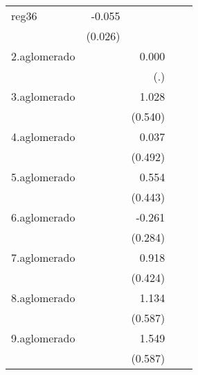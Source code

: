 {\begin{longtable}{l*{4}{D{.}{.}{-1}}}
\addlinespace
reg36       &      -0.055\sym{*}  &                     &                     &                     \\
            &     (0.026)         &                     &                     &                     \\
\addlinespace
2.aglomerado&                     &       0.000         &                     &                     \\
            &                     &         (.)         &                     &                     \\
\addlinespace
3.aglomerado&                     &       1.028         &                     &                     \\
            &                     &     (0.540)         &                     &                     \\
\addlinespace
4.aglomerado&                     &       0.037         &                     &                     \\
            &                     &     (0.492)         &                     &                     \\
\addlinespace
5.aglomerado&                     &       0.554         &                     &                     \\
            &                     &     (0.443)         &                     &                     \\
\addlinespace
6.aglomerado&                     &      -0.261         &                     &                     \\
            &                     &     (0.284)         &                     &                     \\
\addlinespace
7.aglomerado&                     &       0.918\sym{*}  &                     &                     \\
            &                     &     (0.424)         &                     &                     \\
\addlinespace
8.aglomerado&                     &       1.134         &                     &                     \\
            &                     &     (0.587)         &                     &                     \\
\addlinespace
9.aglomerado&                     &       1.549\sym{**} &                     &                     \\
            &                     &     (0.587)         &                     &                     \\

\end{longtable}}
